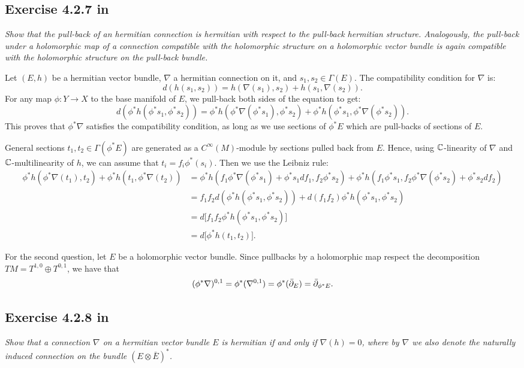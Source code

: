 \documentclass{article}
\begin{document}
\subsection*{Exercise 4.2.7 in \cite{Huy}}
\emph{Show that the pull-back of an hermitian connection is hermitian with respect to the pull-back hermitian structure.
Analogously, the pull-back under a holomorphic map of a connection compatible with the holomorphic structure 
on a holomorphic vector bundle is again compatible with the holomorphic structure on the pull-back bundle.}
\vspace{3mm}

Let $(E,h)$ be a hermitian vector bundle, $\nabla$ a hermitian connection on it, and $s_1, s_2 \in \Gamma(E)$. The
compatibility condition for $\nabla$ is:
\[	d(h(s_1,s_2)) = h(\nabla(s_1),s_2) + h(s_1, \nabla(s_2)).	\]
For any map $\phi : Y \to X$ to the base manifold of $E$, we pull-back both
sides of the equation to get:
\[ d(\phi^*h(\phi^*s_1, \phi^*s_2)) = \phi^*h( \phi^*\nabla(\phi^*s_1), \phi^*s_2) + \phi^*h(\phi^*s_1, \phi^*\nabla(\phi^*s_2)).\]
This proves that $\phi^*\nabla$ satisfies the compatibility condition, as long as we use sections of $\phi^*E$ which are
pull-backs of sections of $E$.

General sections $t_1, t_2 \in \Gamma(\phi^*E)$ are generated as a $C^{\infty}(M)$-module by sections pulled back from $E$.
Hence, using $\mathbb{C}$-linearity of $\nabla$ and $\mathbb{C}$-multilinearity of $h$, we can assume that $t_i = f_i \phi^*(s_i)$. Then
we use the Leibniz rule:
\begin{align*}
\phi^*h( \phi^*\nabla(t_1), t_2) + \phi^*h(t_1, \phi^*\nabla(t_2)) &=
\phi^*h( f_1 \phi^*\nabla(\phi^*s_1) + \phi^*s_1 df_1 , f_2 \phi^*s_2) + 
\phi^*h(f_1 \phi^*s_1, f_2\phi^*\nabla(\phi^*s_2) + \phi^*s_2 df_2) \\
&= f_1 f_2 d(\phi^*h(\phi^*s_1, \phi^*s_2)) + d(f_1f_2) \phi^*h(\phi^*s_1, \phi^*s_2) \\
&= d\big[f_1 f_2 \phi^*h(\phi^*s_1, \phi^*s_2) \big] \\
&= d\big[\phi^*h(t_1,t_2) \big].
\end{align*}

For the second question, let $E$ be a holomorphic vector bundle. Since pullbacks by a holomorphic map respect the 
decomposition $TM = T^{1,0} \oplus T^{0,1}$, we have that
\[	(\phi^* \nabla)^{0,1} = \phi^*(\nabla^{0,1}) = \phi^*(\bar {\partial}_E) = \bar {\partial}_{\phi^* E}.	\]


\subsection*{Exercise 4.2.8 in \cite{Huy}}
\emph{Show that a connection $\nabla$ on a hermitian vector bundle $E$ is hermitian if and only if $\nabla(h) = 0$, where
by $\nabla$ we also denote the naturally induced connection on the bundle $(E\otimes \bar E)^*$.}
\vspace{3mm}
\end{document}
